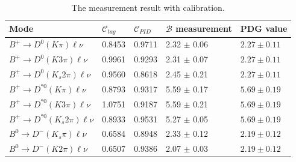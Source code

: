 \begin{table}[h]
\small
\begin{center}
\begin{tabular}{ |p{3.7cm}||p{2cm}||p{2cm}||p{2.4cm}||p{2.4cm}| }
\hline
 Mode & $\mathcal{C}_{tag}$ & $\mathcal{C}_{PID}$ & $\mathcal{B}$ measurement & PDG value  \\
 \hline
 $ B^+ \rightarrow D^0(K\pi) \ell \nu$ &0.8453  & 0.9711 &2.32 $\pm$ 0.06 & $2.27 \pm 0.11$ \\ 
  \hline
 $ B^+ \rightarrow D^0(K 3 \pi) \ell \nu$ &0.9961  & 0.9293 &2.31 $\pm$ 0.07 & $2.27 \pm 0.11$ \\ 
  \hline
 $ B^+ \rightarrow D^0(K_s 2 \pi) \ell \nu$ &0.9560  & 0.8618 &2.45 $\pm$ 0.21 & $2.27 \pm 0.11$ \\ 
  \hline
 $ B^+ \rightarrow D^{*0}(K\pi) \ell \nu$ &0.8793  & 0.9317 &5.59 $\pm$ 0.17 & $5.69 \pm 0.19$ \\ 
  \hline
 $ B^+ \rightarrow D^{*0}(K 3 \pi) \ell \nu$ &1.0751  & 0.9187 &5.59 $\pm$ 0.21 & $5.69 \pm 0.19$ \\ 
  \hline
 $ B^+ \rightarrow D^{*0}(K_s 2 \pi) \ell \nu$ &0.8933  & 0.9531 &5.27 $\pm$ 0.05 & $5.69 \pm 0.19$ \\ 
  \hline
 $ B^0 \rightarrow D^-(K_s\pi) \ell \nu$ &0.6584  & 0.8948 &2.33 $\pm$ 0.12 & $2.19 \pm 0.12$ \\ 
  \hline
 $ B^0 \rightarrow D^-(K 2 \pi) \ell \nu$ &0.6507  & 0.9386 &2.07 $\pm$ 0.03 & $2.19 \pm 0.12$ \\ 
 \hline
 \hline
\end{tabular}
\caption{The measurement result with calibration.} \label{t:brafterc}
\end{center}
\end{table}

